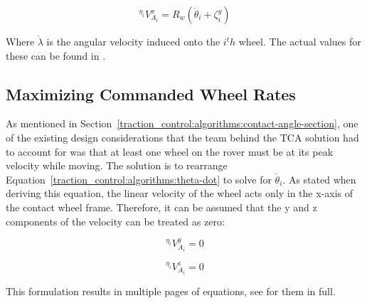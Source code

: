 \begin{equation}\label{traction_control:algorithms:theta-dot}
	{}^{\eta_{i}}V^{x}_{A_{i}} = R_{w}\left(\dot{\theta}_{i} + \zeta^{y}_{i}\right)
\end{equation}

Where $\dot{\lambda}$ is the angular velocity induced onto the $i^th$ wheel. The actual values for these can be found in \cite{tractl}.

\subsection{Maximizing Commanded Wheel Rates}
As mentioned in Section~\ref{traction_control:algorithms:contact-angle-section}, one of the existing design considerations that the team behind the \ac{TCA} solution had to account for was that at least one wheel on the rover must be at its peak velocity while moving. The solution is to rearrange Equation~\ref{traction_control:algorithms:theta-dot} to solve for $\dot{\theta}_{i}$. As stated when deriving this equation, the linear velocity of the wheel acts only in the x-axis of the contact wheel frame. Therefore, it can be assumed that the y and z components of the velocity can be treated as zero:

\begin{equation}\label{traction_control:algorithms:lin_vel_y}
	{}^{\eta_{i}}V^{y}_{A_{i}} = 0
\end{equation}

\begin{equation}\label{traction_control:algorithms:lin_vel_z}
	{}^{\eta_{i}}V^{z}_{A_{i}} = 0
\end{equation}

This formulation results in multiple pages of equations, see \cite{tractl} for them in full.
